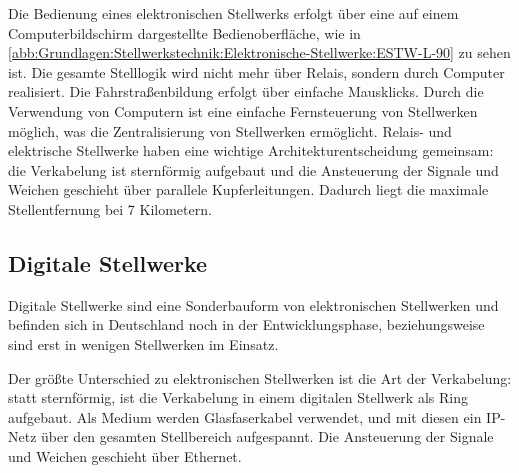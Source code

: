 Die Bedienung eines elektronischen Stellwerks erfolgt über eine auf einem Computerbildschirm dargestellte Bedienoberfläche, wie in \autoref{abb:Grundlagen:Stellwerkstechnik:Elektronische-Stellwerke:ESTW-L-90} zu sehen ist. Die gesamte Stelllogik wird nicht mehr über Relais, sondern durch Computer realisiert. Die Fahrstraßenbildung erfolgt über einfache Mausklicks. Durch die Verwendung von Computern ist eine einfache Fernsteuerung von Stellwerken möglich, was die Zentralisierung von Stellwerken ermöglicht. Relais- und elektrische Stellwerke haben eine wichtige Architekturentscheidung gemeinsam: die Verkabelung ist sternförmig aufgebaut und die Ansteuerung der Signale und Weichen geschieht über parallele Kupferleitungen. Dadurch liegt die maximale Stellentfernung bei 7 Kilometern.

\subsection{Digitale Stellwerke}\label{text:Grundlagen:Stellwerkstechnik:Digitale-Stellwerke}

Digitale Stellwerke sind eine Sonderbauform von elektronischen Stellwerken und befinden sich in Deutschland noch in der Entwicklungsphase, beziehungsweise sind erst in wenigen Stellwerken im Einsatz.

Der größte Unterschied zu elektronischen Stellwerken ist die Art der Verkabelung: statt sternförmig, ist die Verkabelung in einem digitalen Stellwerk als Ring aufgebaut. Als Medium werden Glasfaserkabel verwendet, und mit diesen ein IP-Netz über den gesamten Stellbereich aufgespannt. Die Ansteuerung der Signale und Weichen geschieht über Ethernet.
